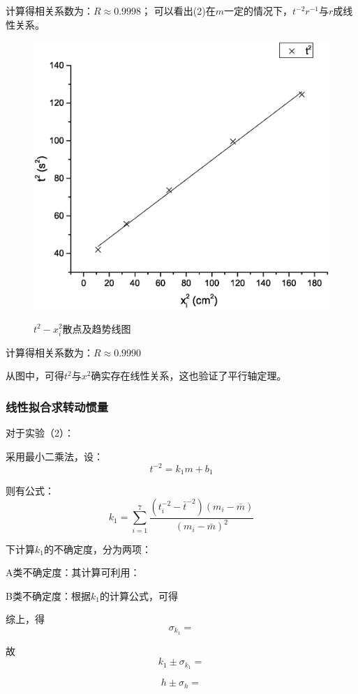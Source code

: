 \documentclass{ctexart}
\begin{document}
      计算得相关系数为：$R\approx0.9998$；     
      可以看出(2)在$m$一定的情况下，$t^{-2}r^{-1}$与$r$成线性关系。
      \begin{figure}[H]
        \centering
        \caption{$t^2-x_i^2$散点及趋势线图}
        \includegraphics[width=1.0\textwidth]{3}
        \label{fig:digit}
      \end{figure}
      计算得相关系数为：$R\approx0.9990$
      
      从图中，可得$t^2$与$x^2$确实存在线性关系，这也验证了平行轴定理。
      \subsubsection{线性拟合求转动惯量}
      对于实验（2）：

      采用最小二乘法，设：$$t^{-2}=k_1m+b_1$$
      
      则有公式：$$k_1=\sum\limits_{i=1}^7\frac{(t_i^{-2}-\bar{t}^{-2})(m_i-\bar{m})}{(m_i-\bar{m})^2}$$

      下计算$k_1$的不确定度，分为两项：
      
      A类不确定度：其计算可利用：

      B类不确定度：根据$k_1$的计算公式，可得

      综上，得$$\sigma_{k_1}=$$

      故$$k_1\pm\sigma_{k_1}=$$

      $$h\pm\sigma_h=$$
\end{document}
